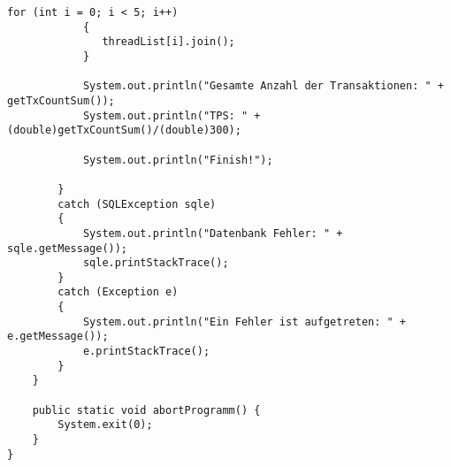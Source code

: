 \begin{lstlisting}[caption={Main}, label={lst:pr1}]
			for (int i = 0; i < 5; i++)
	        {
	           threadList[i].join();
	        }
		    
			System.out.println("Gesamte Anzahl der Transaktionen: " + getTxCountSum());
			System.out.println("TPS: " + (double)getTxCountSum()/(double)300);
			
			System.out.println("Finish!");
		    
		} 
		catch (SQLException sqle)
		{
			System.out.println("Datenbank Fehler: " + sqle.getMessage());
			sqle.printStackTrace();
		}
		catch (Exception e)
		{
			System.out.println("Ein Fehler ist aufgetreten: " + e.getMessage());
			e.printStackTrace();
		}
	}
	
	public static void abortProgramm() {
		System.exit(0);
	}
}
\end{lstlisting}

